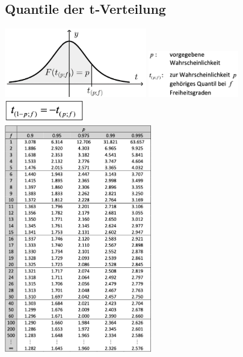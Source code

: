 \documentclass[8pt,a4paper]{scrartcl}
\begin{document}
\begin{multicols*}{2}
	\subsection{Quantile der t‐Verteilung}
		\begin{multicols*}{2}
			\includegraphics[height=3cm]{img/QuantileT1.png}
			\includegraphics[height=2cm]{img/QuantileT2.png} \\
			\includegraphics[height=1cm]{img/QuantileT3.png} \\
			\includegraphics[height=10cm]{img/QuantileT4.png}
		\end{multicols*}


\end{multicols*}
\end{document}
